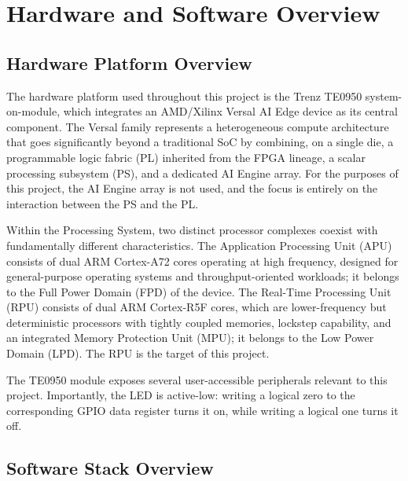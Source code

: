 \documentclass[
	a4paper,
]{CSMakotoTechnicalReport}
\begin{document}

\section{Hardware and Software Overview}
\label{ch:hardware}

\subsection{Hardware Platform Overview}
\label{sec:hardware-platform}

The hardware platform used throughout this project is the Trenz TE0950 system-on-module, which integrates an AMD/Xilinx Versal AI Edge device as its central component.
The Versal family represents a heterogeneous compute architecture that goes significantly beyond a traditional SoC by combining, on a single die, a programmable logic fabric (PL) inherited from the FPGA lineage, a scalar processing subsystem (PS), and a dedicated AI Engine array.
For the purposes of this project, the AI Engine array is not used, and the focus is entirely on the interaction between the PS and the PL.

Within the Processing System, two distinct processor complexes coexist with fundamentally different characteristics.
The Application Processing Unit (APU) consists of dual ARM Cortex-A72 cores operating at high frequency, designed for general-purpose operating systems and throughput-oriented workloads; it belongs to the Full Power Domain (FPD) of the device.
The Real-Time Processing Unit (RPU) consists of dual ARM Cortex-R5F cores, which are lower-frequency but deterministic processors with tightly coupled memories, lockstep capability, and an integrated Memory Protection Unit (MPU); it belongs to the Low Power Domain (LPD).
The RPU is the target of this project.

The TE0950 module exposes several user-accessible peripherals relevant to this project.
Importantly, the LED is active-low: writing a logical zero to the corresponding GPIO data register turns it on, while writing a logical one turns it off.

\subsection{Software Stack Overview}
\label{sec:software-stack}
\end{document}
